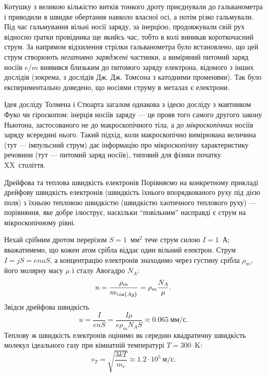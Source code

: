 Котушку з великою кількістю витків тонкого дроту приєднували до гальванометра і приводили в швидке обертання навколо власної осі, а потім різко
гальмували. Під час гальмування вільні носії заряду, за інерцією, продовжували свій рух відносно ґратки провідника ще якийсь час, тобто в колі
виникав короткочасний струм. За напрямом відхилення стрілки гальванометра було встановлено, що цей струм створюють \emph{негативно заряджені}
частинки, а виміряний питомий заряд носіїв $e/m$ виявився близьким до питомого заряду електрона, відомого з інших дослідів (зокрема, з дослідів Дж.
Дж. Томсона з катодними променями). Так було експериментально доведено, що носіями струму в металах є електрони.

\begin{Historical}
	Ідея досліду Толмена і Стюарта загалом однакова з ідеєю досліду з маятником Фуко чи гіроскопом: інерція носіїв заряду --- це прояв того самого
	другого закону Ньютона, застосованого не до макроскопічного тіла, а до \emph{мікроскопічних} носіїв заряду всередині нього. Такий підхід,
	коли макроскопічно вимірювана величина (тут --- імпульсний струм) дає інформацію про мікроскопічну характеристику речовини (тут --- питомий
	заряд носіїв), типовий для фізики початку XX~століття.
\end{Historical}

\begin{Example}{Дрейфова та теплова швидкість електронів}
Порівняємо на конкретному прикладі дрейфову швидкість електронів (швидкість їхнього впорядкованого руху під дією поля) з їхньою тепловою швидкістю
(швидкістю хаотичного теплового руху) --- порівняння, яке добре ілюструє, наскільки \enquote{повільним} насправді є струм на мікроскопічному рівні.

Нехай срібним дротом перерізом $S=1$~мм$^2$ тече струм силою $I=1$~А; вважатимемо, що кожен атом срібла віддає один вільний електрон. Струм
$I = jS = enuS$, а концентрацію електронів знаходимо через густину срібла $\rho_m$, його молярну масу $\mu$ і сталу Авогадро $N_A$:
\begin{equation*}
	n = \frac{\rho_m}{m_{\ce{Ag}}} = \rho_m\frac{N_A}{\mu}.
\end{equation*}
Звідси дрейфова швидкість
\begin{equation*}
	u = \frac{I}{enS} = \frac{I\mu}{e\rho_m N_A S} \approx 0.065\ \text{мм/с}.
\end{equation*}
Теплову ж швидкість електронів оцінимо як середню квадратичну швидкість молекул ідеального газу при кімнатній температурі $T=300$~K:
\begin{equation*}
	v_T = \sqrt{\frac{3kT}{m_e}} \approx 1.2\cdot 10^5\ \text{м/с}.
\end{equation*}
\end{Example}

